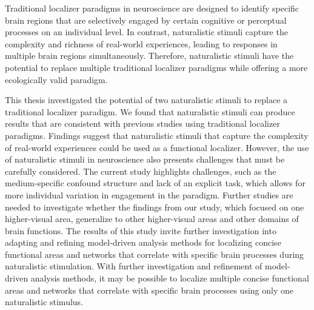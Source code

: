
%
Traditional localizer paradigms in neuroscience are designed to identify
specific brain regions that are selectively engaged by certain cognitive or
perceptual processes on an individual level.
%
In contrast, naturalistic stimuli capture the complexity and richness of
real-world experiences, leading to responses in multiple brain regions
simultaneously.
%
Therefore, naturalistic stimuli have the potential to replace multiple
traditional localizer paradigms while offering a more ecologically valid
paradigm.

%
This thesis investigated the potential of two naturalistic stimuli to replace a
traditional localizer paradigm.
%
We found that naturalistic stimuli can produce results that are consistent with
previous studies using traditional localizer paradigms.
%
Findings suggest that naturalistic stimuli that capture the complexity of
real-world experiences could be used as a functional localizer.
%
However, the use of naturalistic stimuli in neuroscience also presents
challenges that must be carefully considered.
%
The current study highlights challenges, such as the medium-specific confound
structure and lack of an explicit task, which allows for more individual
variation in engagement in the paradigm.
Further studies are needed to investigate whether the findings from our study,
which focused on one higher-visual area, generalize to other higher-visual areas
and other domains of brain functions.
%
The results of this study invite further investigation into adapting and
refining model-driven analysis methods for localizing concise functional areas
and networks that correlate with specific brain processes during naturalistic
stimulation.
%
With further investigation and refinement of model-driven analysis methods, it
may be possible to localize multiple concise functional areas and networks that
correlate with specific brain processes using only one naturalistic stimulus.

